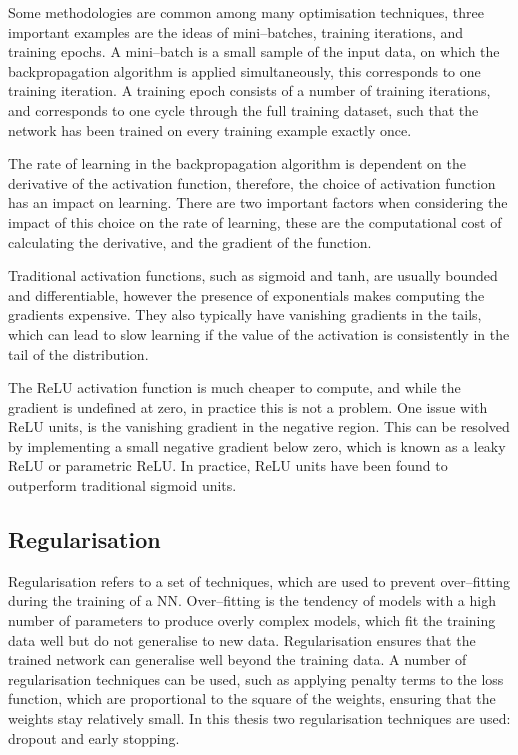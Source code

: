 Some methodologies are common among many optimisation techniques, three 
important examples are the ideas of mini--batches, training iterations, and 
training epochs. A mini--batch is a small sample of the input data, on which 
the backpropagation algorithm is applied simultaneously, this corresponds to 
one training iteration. A training epoch consists of a number of training 
iterations, and corresponds to one cycle through the full training dataset, 
such that the network has been trained on every training example exactly 
once.

\medskip\noindent
The rate of learning in the backpropagation algorithm is dependent on the
derivative of the activation function, therefore, the choice of activation
function has an impact on learning. There are two important factors when
considering the impact of this choice on the rate of learning, these are the 
computational cost of calculating the derivative, and the gradient of the 
function. 

Traditional activation functions, such as sigmoid and tanh, are usually 
bounded and differentiable, however the presence of exponentials makes 
computing the gradients expensive. They also typically have vanishing 
gradients in the tails, which can lead to slow learning if the value of the 
activation is consistently in the tail of the distribution. 

The ReLU activation function is much cheaper to compute, and while the 
gradient is undefined at zero, in practice this is not a problem. One issue 
with ReLU units, is the vanishing gradient in the negative region. This can be 
resolved by implementing a small negative gradient below zero, which is known 
as a leaky ReLU or parametric ReLU\cite{He2015}. In practice, ReLU units have 
been found to outperform traditional sigmoid 
units\cite{Maas13rectifiernonlinearities, 10.5555/3104322.3104425}.

\subsection{Regularisation}
Regularisation refers to a set of techniques, which are used to prevent
over--fitting during the training of a NN. Over--fitting is the tendency
of models with a high number of parameters to produce overly complex models,
which fit the training data well but do not generalise to new data.  
Regularisation ensures that the trained network can generalise well beyond the 
training data. A number of regularisation techniques can be used, such as 
applying penalty terms to the loss function, which are proportional to the 
square of the weights, ensuring that the weights stay relatively small. In 
this thesis two regularisation techniques are used: 
dropout\cite{Srivastava2014DropoutAS} and early 
stopping\cite{OrrGenevieveB.1998NNTo}.

